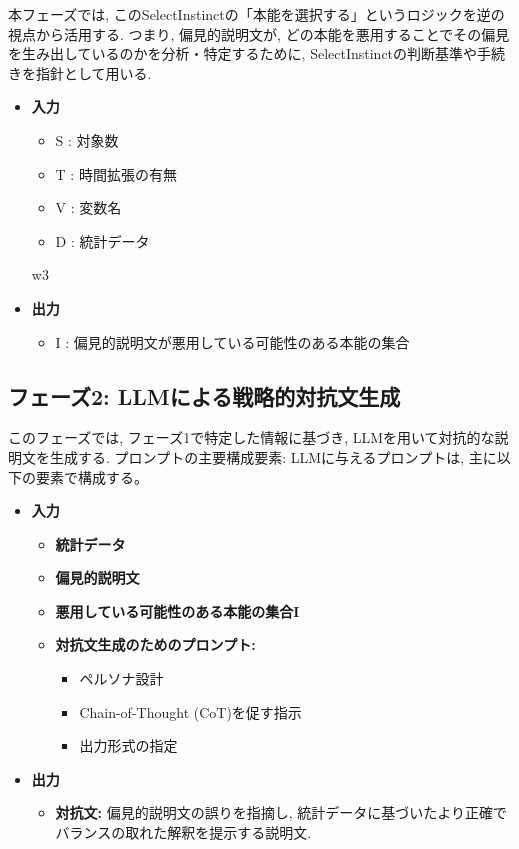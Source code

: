\documentclass[dvipdfmx]{jsarticle}
\begin{document}
本フェーズでは, このSelectInstinctの「本能を選択する」というロジックを逆の視点から活用する. つまり, 偏見的説明文が,
どの本能を悪用することでその偏見を生み出しているのかを分析・特定するために, SelectInstinctの判断基準や手続きを指針として用いる.
\begin{itemize}
  \item \textbf{入力}
        \begin{itemize}
          \item S : 対象数
          \item T : 時間拡張の有無
          \item V : 変数名
          \item D : 統計データ
        \end{itemize}w3
  \item \textbf{出力}
        \begin{itemize}
          \item I : 偏見的説明文が悪用している可能性のある本能の集合
        \end{itemize}
\end{itemize}

\subsection{フェーズ2: LLMによる戦略的対抗文生成}
このフェーズでは, フェーズ1で特定した情報に基づき, LLMを用いて対抗的な説明文を生成する.
プロンプトの主要構成要素: LLMに与えるプロンプトは, 主に以下の要素で構成する。
\begin{itemize}
  \item \textbf{入力}
        \begin{itemize}
          \item \textbf{統計データ}
          \item \textbf{偏見的説明文}
          \item \textbf{悪用している可能性のある本能の集合I}
          \item \textbf{対抗文生成のためのプロンプト:}
                \begin{itemize}
                  \item ペルソナ設計
                  \item Chain-of-Thought (CoT)を促す指示
                  \item 出力形式の指定
                \end{itemize}
        \end{itemize}
  \item \textbf{出力}
        \begin{itemize}
          \item \textbf{対抗文:} 偏見的説明文の誤りを指摘し, 統計データに基づいたより正確でバランスの取れた解釈を提示する説明文.
        \end{itemize}
\end{itemize}
\end{document}
